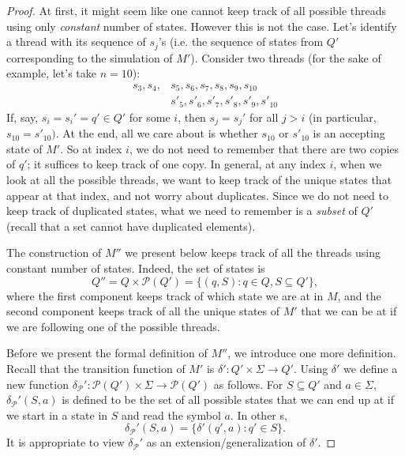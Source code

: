 \begin{flex}
\begin{proof}
At first, it might seem like one cannot keep track of all possible threads using only \emph{constant} number of states. 
However this is not the case. 
Let's identify a thread with its sequence of $s_j$'s (i.e. the sequence of states from $Q'$ corresponding to the simulation of $M'$). 
Consider two threads (for the sake of example, let's take $n = 10$):
\begin{align*}
s_3, s_4, & s_5, s_6, s_7, s_8, s_9, s_{10} \\
& s'_5, s'_6, s'_7, s'_8, s'_9, s'_{10}
\end{align*}
If, say, $s_i = s_i' = q' \in Q'$ for some $i$, then $s_j = s_j'$ for all $j > i$ (in particular, $s_{10} = s'_{10})$. 
At the end, all we care about is whether $s_{10}$ or $s'_{10}$ is an accepting state of $M'$. 
So at index $i$, we do not need to remember that there are two copies of $q'$; it suffices to keep track of one copy. 
In general, at any index $i$, when we look at all the possible threads, we want to keep track of the unique states that appear at that index, and not worry about duplicates. 
Since we do not need to keep track of duplicated states, what we need to remember is a \emph{subset} of $Q'$ (recall that a set cannot have duplicated elements).

The construction of $M''$ we present below keeps track of all the threads using constant number of states. 
Indeed, the set of states is 
\[
    Q'' = Q \times \mathcal{P}(Q') = \{(q, S): q \in Q, S \subseteq Q'\}, 
\]
where the first component keeps track of which state we are at in $M$, and the second component keeps track of all the unique states of $M'$ that we can be at if we are following one of the possible threads.

Before we present the formal definition of $M''$, we introduce one more definition. 
Recall that the transition function of $M'$ is $\delta' : Q' \times \Sigma \to Q'$. 
Using $\delta'$ we define a new function $\delta_{\mathcal{P}}' : \mathcal{P}(Q') \times \Sigma \to \mathcal{P}(Q')$ as follows. 
For $S \subseteq Q'$ and $a \in \Sigma$, $\delta_{\mathcal{P}}'(S, a)$ is defined to be the set of all possible states that we can end up at if we start in a state in $S$ and read the symbol $a$. 
In other s,
\[
   \delta_{\mathcal{P}}'(S, a) = \{\delta'(q', a) : q' \in S\}.
\]
It is appropriate to view $\delta_{\mathcal{P}}'$ as an extension/generalization of $\delta'$.


\end{proof}
\end{flex}
